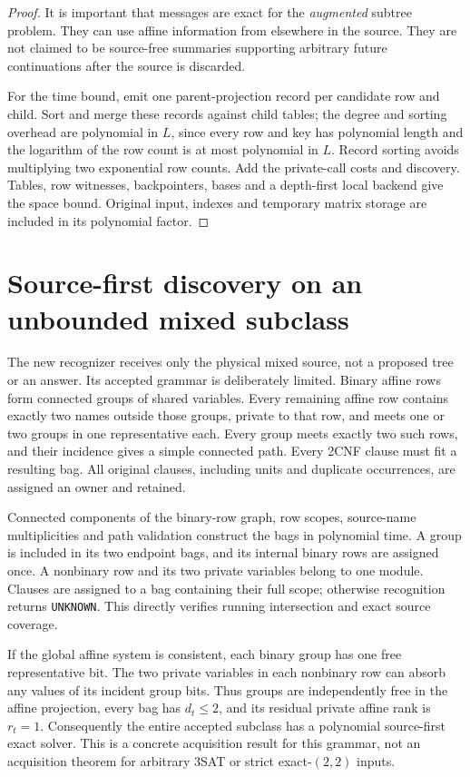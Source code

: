 \documentclass[11pt]{article}
\begin{document}
\begin{proof}
It is important that messages are exact for the \emph{augmented} subtree problem. They can use affine information from elsewhere in the source. They are not claimed to be source-free summaries supporting arbitrary future continuations after the source is discarded.

For the time bound, emit one parent-projection record per candidate row and child. Sort and merge these records against child tables; the degree and sorting overhead are polynomial in $L$, since every row and key has polynomial length and the logarithm of the row count is at most polynomial in $L$. Record sorting avoids multiplying two exponential row counts. Add the private-call costs and discovery. Tables, row witnesses, backpointers, bases and a depth-first local backend give the space bound. Original input, indexes and temporary matrix storage are included in its polynomial factor.
\end{proof}

\section{Source-first discovery on an unbounded mixed subclass}
The new recognizer receives only the physical mixed source, not a proposed tree or an answer. Its accepted grammar is deliberately limited. Binary affine rows form connected groups of shared variables. Every remaining affine row contains exactly two names outside those groups, private to that row, and meets one or two groups in one representative each. Every group meets exactly two such rows, and their incidence gives a simple connected path. Every 2CNF clause must fit a resulting bag. All original clauses, including units and duplicate occurrences, are assigned an owner and retained.

Connected components of the binary-row graph, row scopes, source-name multiplicities and path validation construct the bags in polynomial time. A group is included in its two endpoint bags, and its internal binary rows are assigned once. A nonbinary row and its two private variables belong to one module. Clauses are assigned to a bag containing their full scope; otherwise recognition returns \texttt{UNKNOWN}. This directly verifies running intersection and exact source coverage.

If the global affine system is consistent, each binary group has one free representative bit. The two private variables in each nonbinary row can absorb any values of its incident group bits. Thus groups are independently free in the affine projection, every bag has $d_t\le2$, and its residual private affine rank is $r_t=1$. Consequently the entire accepted subclass has a polynomial source-first exact solver. This is a concrete acquisition result for this grammar, not an acquisition theorem for arbitrary 3SAT or strict exact-$(2,2)$ inputs.
\end{document}
